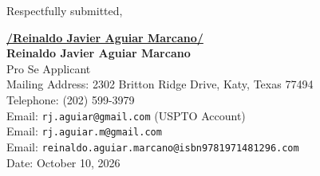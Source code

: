 \documentclass[11pt,letterpaper]{article}
\begin{document}
\vspace{0.8cm}
\begin{singlespace}
\noindent Respectfully submitted, \par\vspace{1.0cm}
\underline{\textbf{/Reinaldo Javier Aguiar Marcano/}} \\
\textbf{Reinaldo Javier Aguiar Marcano} \\
Pro Se Applicant \\
Mailing Address: 2302 Britton Ridge Drive, Katy, Texas 77494 \\
Telephone: (202) 599-3979 \\
Email: \texttt{rj.aguiar@gmail.com} (USPTO Account) \\
Email: \texttt{rj.aguiar.m@gmail.com} \\
Email: \texttt{reinaldo.aguiar.marcano@isbn9781971481296.com} \\
Date: October 10, 2026
\end{singlespace}
\end{document}
